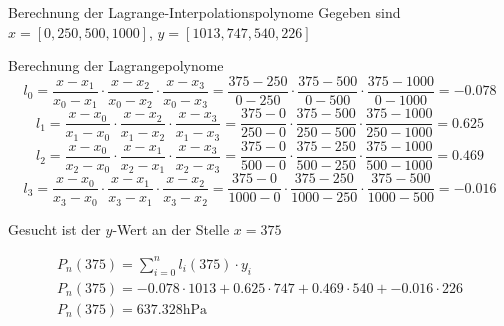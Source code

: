 \begin{example2}{Berechnung der Lagrange-Interpolationspolynome}
    Gegeben sind
    $x=[0,250,500,1000]$, $y=[1013,747,540,226]$

    Berechnung der Lagrangepolynome
    $$l_0=\frac{x-x_1}{x_0-x_1} \cdot \frac{x-x_2}{x_0-x_2} \cdot \frac{x-x_3}{x_0-x_3}=\frac{375-250}{0-250} \cdot \frac{375-500}{0-500} \cdot \frac{375-1000}{0-1000}=-0.078$$
    $$l_1=\frac{x-x_0}{x_1-x_0} \cdot \frac{x-x_2}{x_1-x_2} \cdot \frac{x-x_3}{x_1-x_3}=\frac{375-0}{250-0} \cdot \frac{375-500}{250-500} \cdot \frac{375-1000}{250-1000}=0.625$$
    $$l_2=\frac{x-x_0}{x_2-x_0} \cdot \frac{x-x_1}{x_2-x_1} \cdot \frac{x-x_3}{x_2-x_3}=\frac{375-0}{500-0} \cdot \frac{375-250}{500-250} \cdot \frac{375-1000}{500-1000}=0.469$$
    $$l_3=\frac{x-x_0}{x_3-x_0} \cdot \frac{x-x_1}{x_3-x_1} \cdot \frac{x-x_2}{x_3-x_2}=\frac{375-0}{1000-0} \cdot \frac{375-250}{1000-250} \cdot \frac{375-500}{1000-500}=-0.016$$

    Gesucht ist der $y$-Wert an der Stelle $x=375$

    $$
    \begin{gathered}
    P_n(375)=\sum_{i=0}^n l_i(375) \cdot y_i \\
    P_n(375)=-0.078 \cdot 1013+0.625 \cdot 747+0.469 \cdot 540+-0.016 \cdot 226 \\
    P_n(375)=637.328 \mathrm{hPa}
    \end{gathered}
    $$
  
\end{example2}

